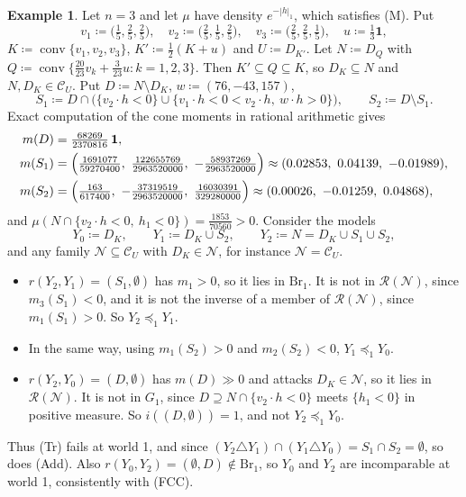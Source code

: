 \documentclass[11pt]{article}
\newcommand{\one}{\mathbf{1}}
\newcommand{\CC}{\mathcal{C}}
\newcommand{\NN}{\mathcal{N}}
\newcommand{\RR}{\mathcal{R}}
\newcommand{\Br}{\mathrm{Br}}
\DeclareMathOperator{\conv}{conv}
\theoremstyle{plain}
\theoremstyle{definition}
\newtheorem{example}[theorem]{Example}
\theoremstyle{remark}
\begin{document}
\begin{example}\label{ex:add}
Let $n=3$ and let $\mu$ have density $e^{-|h|_1}$, which satisfies (M). Put
\[
  v_1\coloneqq\bigl(\tfrac15,\tfrac25,\tfrac25\bigr),\quad
  v_2\coloneqq\bigl(\tfrac25,\tfrac15,\tfrac25\bigr),\quad
  v_3\coloneqq\bigl(\tfrac25,\tfrac25,\tfrac15\bigr),\quad
  u\coloneqq\tfrac13\one,
\]
$K\coloneqq\conv\{v_1,v_2,v_3\}$, $K'\coloneqq\tfrac12(K+u)$ and $U\coloneqq D_{K'}$. Let
$N\coloneqq D_Q$ with $Q\coloneqq\conv\{\tfrac{20}{23}v_k+\tfrac3{23}u:k=1,2,3\}$. Then
$K'\subseteq Q\subseteq K$, so $D_K\subseteq N$ and $N,D_K\in\CC_U$. Put
$D\coloneqq N\setminus D_K$, $w\coloneqq(76,-43,157)$,
\[
  S_1\coloneqq D\cap\bigl(\{v_2\cdot h<0\}\cup\{v_1\cdot h<0<v_2\cdot h,\ w\cdot h>0\}
  \bigr),\qquad S_2\coloneqq D\setminus S_1 .
\]
Exact computation of the cone moments in rational arithmetic gives
\begin{align*}
  m(D)&=\tfrac{68269}{2370816}\,\one,\\
  m(S_1)&=\Bigl(\tfrac{1691077}{59270400},\ \tfrac{122655769}{2963520000},\
  -\tfrac{58937269}{2963520000}\Bigr)\approx(0.02853,\ 0.04139,\ -0.01989),\\
  m(S_2)&=\Bigl(\tfrac{163}{617400},\ -\tfrac{37319519}{2963520000},\
  \tfrac{16030391}{329280000}\Bigr)\approx(0.00026,\ -0.01259,\ 0.04868),
\end{align*}
and $\mu(N\cap\{v_2\cdot h<0,\ h_1<0\})=\tfrac{1853}{70560}>0$. Consider the models
\[
  Y_0\coloneqq D_K,\qquad Y_1\coloneqq D_K\cup S_2,\qquad Y_2\coloneqq N=D_K\cup S_1\cup
  S_2 ,
\]
and any family $\NN\subseteq\CC_U$ with $D_K\in\NN$, for instance $\NN=\CC_U$.
\begin{itemize}
  \item $r(Y_2,Y_1)=(S_1,\emptyset)$ has $m_1>0$, so it lies in $\Br_1$. It is not in
  $\RR(\NN)$, since $m_3(S_1)<0$, and it is not the inverse of a member of $\RR(\NN)$,
  since $m_1(S_1)>0$. So $Y_2\preceq_1Y_1$.
  \item In the same way, using $m_1(S_2)>0$ and $m_2(S_2)<0$, $Y_1\preceq_1Y_0$.
  \item $r(Y_2,Y_0)=(D,\emptyset)$ has $m(D)\gg0$ and attacks $D_K\in\NN$, so it lies in
  $\RR(\NN)$. It is not in $G_1$, since $D\supseteq N\cap\{v_2\cdot h<0\}$ meets
  $\{h_1<0\}$ in positive measure. So $i((D,\emptyset))=1$, and not $Y_2\preceq_1Y_0$.
\end{itemize}
Thus (Tr) fails at world 1, and since $(Y_2\triangle Y_1)\cap(Y_1\triangle Y_0)=S_1\cap
S_2=\emptyset$, so does (Add). Also $r(Y_0,Y_2)=(\emptyset,D)\notin\Br_1$, so $Y_0$ and
$Y_2$ are incomparable at world 1, consistently with (FCC).
\end{example}
\end{document}
